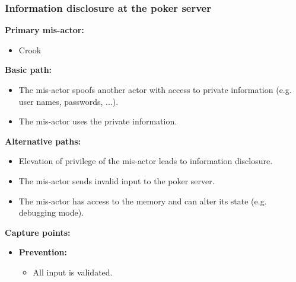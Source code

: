 \documentclass[a4paper,11pt]{report}
\begin{document}
\subsubsection{Information disclosure at the poker server}
\label{PokerServerCasesI}
\textbf{Primary mis-actor:}
\begin{itemize}
\item Crook
\end{itemize}
\textbf{Basic path:}
\begin{itemize}
\item The mis-actor spoofs another actor with access to private information (e.g. user names, passwords, ...).
\item The mis-actor uses the private information.
\end{itemize}
\textbf{Alternative paths:}
\begin{itemize}
\item Elevation of privilege of the mis-actor leads to information disclosure.
\item The mis-actor sends invalid input to the poker server.
\item The mis-actor has access to the memory and can alter its state (e.g. debugging mode).
\end{itemize}
\textbf{Capture points:}
\begin{itemize}
\item \textbf{Prevention:}
\begin{itemize}
\item All input is validated.
\end{itemize}
\end{itemize}
\end{document}
